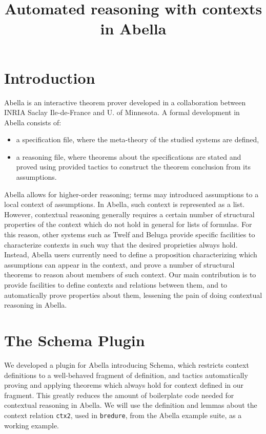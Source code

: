 \documentclass[nocopyrightspace,authoryear]{sigplanconf}
\title{Automated reasoning with contexts in Abella}
\begin{document}
\maketitle
\section{Introduction}

Abella \cite{abellasys} is an interactive theorem prover developed in a collaboration between INRIA Saclay Ile-de-France and U. of Minnesota. A formal development in Abella consists of:
\begin{itemize}
\item a specification file, where the meta-theory of the studied systems are defined,
\item a reasoning file, where theorems about the specifications are stated and proved using provided tactics to construct the theorem conclusion from its assumptions.
\end{itemize}

Abella allows for higher-order reasoning; terms may introduced assumptions to a local context of assumptions. In Abella, such context is represented as a list. However, contextual reasoning generally requires a certain number of structural properties of the context which do not hold in general for lists of formulas. For this reason, other systems such as Twelf \cite{twelfsys} and Beluga \cite{belugasys} provide specific facilities to characterize contexts in such way that the desired proprieties always hold. Instead, Abella users currently need to define a proposition characterizing which assumptions can appear in the context, and prove a number of structural theorems to reason about members of such context. Our main contribution is to provide facilities to define contexts and relations between them, and to automatically prove properties about them, lessening the pain of doing contextual reasoning in Abella.



\section{The Schema Plugin}

We developed a plugin for Abella introducing Schema, which restricts context definitions to a well-behaved fragment of definition, and tactics automatically proving and applying theorems which always hold for context defined in our fragment. This greatly reduces the amount of boilerplate code needed for contextual reasoning in Abella. We will use the definition and lemmas about the context relation \lstinline|ctx2|, used in \lstinline|bredure|, from the Abella example suite, as a working example.
\end{document}

